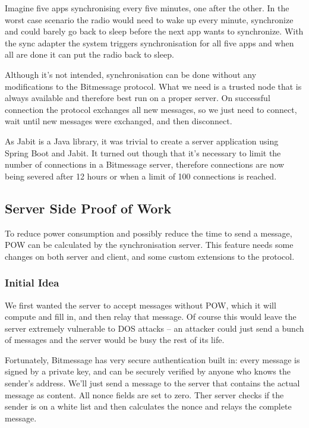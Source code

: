 \documentclass{bfh}
\begin{document}
  Imagine five apps synchronising every five minutes, one after the other. In the worst case scenario the radio would need to wake up every minute, synchronize and could barely go back to sleep before the next app wants to synchronize. With the sync adapter the system triggers synchronisation for all five apps and when all are done it can put the radio back to sleep.

  Although it's not intended, synchronisation can be done without any modifications to the Bitmessage protocol. What we need is a trusted node that is always available and therefore best run on a proper server. On successful connection the protocol exchanges all new messages, so we just need to connect, wait until new messages were exchanged, and then disconnect.

  As Jabit is a Java library, it was trivial to create a server application using Spring Boot and Jabit. It turned out though that it's necessary to limit the number of connections in a Bitmessage server, therefore connections are now being severed after 12 hours or when a limit of 100 connections is reached.

  \subsection{Server Side Proof of Work}
  To reduce power consumption and possibly reduce the time to send a message, \ac{POW} can be calculated by the synchronisation server. This feature needs some changes on both server and client, and some custom extensions to the protocol.

  \subsubsection{Initial Idea}
  We first wanted the server to accept messages without \ac{POW}, which it will compute and fill in, and then relay that message. Of course this would leave the server extremely vulnerable to \ac{DOS} attacks -- an attacker could just send a bunch of messages and the server would be busy the rest of its life.

  Fortunately, Bitmessage has very secure authentication built in: every message is signed by a private key, and can be securely verified by anyone who knows the sender's address. We'll just send a message to the server that contains the actual message as content. All nonce fields are set to zero. Ther server checks if the sender is on a white list and then calculates the nonce and relays the complete message.
\end{document}

